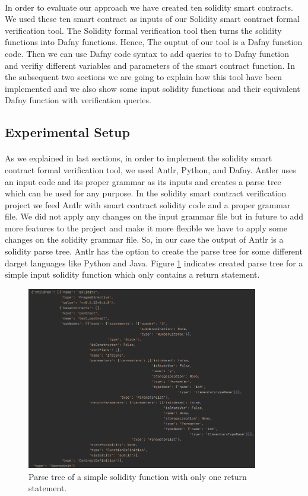 \documentclass[11pt]{article}
\begin{document}
\paragraph{}
In order to evaluate our approach we have created ten solidity smart contracts. We used these ten smart contract as inputs of our Solidity smart contract formal verification tool. The Solidity formal verification tool then turns the solidity functions into Dafny functions. Hence, The ouptut of our tool is a Dafny function code. Then we can use Dafny code syntax to add queries to to Dafny function and verifiy different variables and parameters of the smart contract function. In the subsequent two sections we are going to explain how this tool have been implemented and we also show some input solidity functions and their equivalent Dafny function with verification queries. 

\subsection{Experimental Setup}
\paragraph{}
As we explained in last sections, in order to implement the solidity smart contract formal verification tool, we used Antlr, Python, and Dafny. Antler uses an input code and its proper grammar as its inputs and creates a parse tree which can be used for any purpose.  In the solidity smart contract verification project we feed Antlr with smart contract solidity code and a proper grammar file. We did not apply any changes on the input grammar file but in future to add more features to the project and make it more flexible we have to apply some changes on the solidity grammar file. So, in our case the output of Antlr is a solidity parse tree. Antlr has the option to create the parse tree for some different darget languages like Python and Java. Figure \ref{fig:parstree} indicates created parse tree for a simple input solidity function which only contains a return statement.
\begin{figure}[h]
    \centering
    \includegraphics[width=0.9\textwidth]{figures/parsetree.png}
    \caption{Parse tree of a simple solidity function with only one return statement.}
    \label{fig:parstree}
\end{figure}
\end{document}

